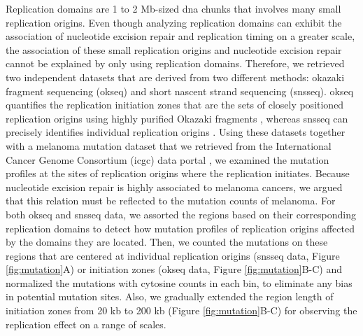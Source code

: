 Replication domains are 1 to 2 Mb-sized \gls{dna} chunks that involves many small replication origins. Even though analyzing replication domains can exhibit the association of nucleotide excision repair and replication timing on a greater scale, the association of these small replication origins and nucleotide excision repair cannot be explained by only using replication domains. Therefore, we retrieved two independent datasets that are derived from two different methods: okazaki fragment sequencing (\gls{okseq}) and short nascent strand sequencing (\gls{snsseq}). \gls{okseq} quantifies the replication initiation zones that are the sets of closely positioned replication origins using highly purified Okazaki fragments \citep{petryk2016replication}, whereas \gls{snsseq} can precisely identifies individual replication origins \citep{besnard2012unraveling,langley2016genome}. Using these datasets together with a melanoma mutation dataset that we retrieved from the International Cancer Genome Consortium (\gls{icgc}) data portal \citep{hayward2017whole}, we examined the mutation profiles at the sites of replication origins where the replication initiates. Because nucleotide excision repair is highly associated to melanoma cancers, we argued that this relation must be reflected to the mutation counts of melanoma. For both \gls{okseq} and \gls{snsseq} data, we assorted the regions based on their corresponding replication domains to detect how mutation profiles of replication origins affected by the domains they are located. Then, we counted the mutations on these regions that are centered at individual replication origins (\gls{snsseq} data, Figure \ref{fig:mutation}A) or initiation zones (\gls{okseq} data, Figure \ref{fig:mutation}B-C) and normalized the mutations with cytosine counts in each bin, to eliminate any bias in potential mutation sites. Also, we gradually extended the region length of initiation zones from 20 kb to 200 kb (Figure \ref{fig:mutation}B-C) for observing the replication effect on a range of scales.

